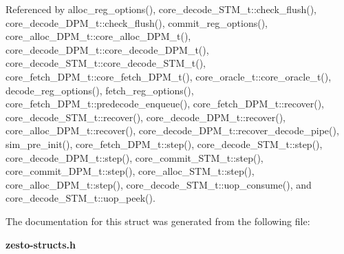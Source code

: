 Referenced by alloc\_\-reg\_\-options(), core\_\-decode\_\-STM\_\-t::check\_\-flush(), core\_\-decode\_\-DPM\_\-t::check\_\-flush(), commit\_\-reg\_\-options(), core\_\-alloc\_\-DPM\_\-t::core\_\-alloc\_\-DPM\_\-t(), core\_\-decode\_\-DPM\_\-t::core\_\-decode\_\-DPM\_\-t(), core\_\-decode\_\-STM\_\-t::core\_\-decode\_\-STM\_\-t(), core\_\-fetch\_\-DPM\_\-t::core\_\-fetch\_\-DPM\_\-t(), core\_\-oracle\_\-t::core\_\-oracle\_\-t(), decode\_\-reg\_\-options(), fetch\_\-reg\_\-options(), core\_\-fetch\_\-DPM\_\-t::predecode\_\-enqueue(), core\_\-fetch\_\-DPM\_\-t::recover(), core\_\-decode\_\-STM\_\-t::recover(), core\_\-decode\_\-DPM\_\-t::recover(), core\_\-alloc\_\-DPM\_\-t::recover(), core\_\-decode\_\-DPM\_\-t::recover\_\-decode\_\-pipe(), sim\_\-pre\_\-init(), core\_\-fetch\_\-DPM\_\-t::step(), core\_\-decode\_\-STM\_\-t::step(), core\_\-decode\_\-DPM\_\-t::step(), core\_\-commit\_\-STM\_\-t::step(), core\_\-commit\_\-DPM\_\-t::step(), core\_\-alloc\_\-STM\_\-t::step(), core\_\-alloc\_\-DPM\_\-t::step(), core\_\-decode\_\-STM\_\-t::uop\_\-consume(), and core\_\-decode\_\-STM\_\-t::uop\_\-peek().

The documentation for this struct was generated from the following file:\begin{CompactItemize}
\item 
{\bf zesto-structs.h}\end{CompactItemize}
